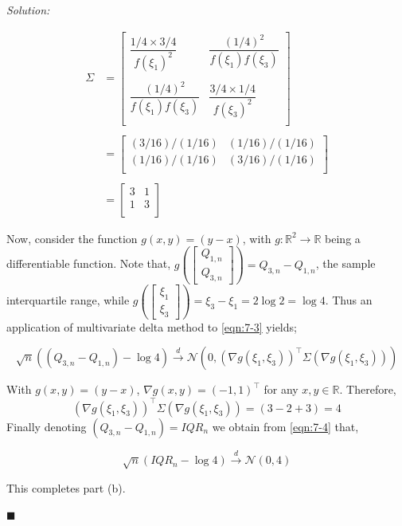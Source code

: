 \documentclass[12pt]{article}
\newcommand{\R}{\mathbb{R}}
\newcommand{\normal}{\mathcal{N}}
\theoremstyle{definition}
\newenvironment{answer}{\textit{Solution: }\quad }{ \hfill $\blacksquare$}
\numberwithin{equation}{section}
\begin{document}
\begin{answer}
\begin{enumerate}
        \begin{align*}
            \Sigma
            & = \begin{bmatrix}
                \dfrac{1/4 \times 3/4}{f(\xi_1)^2} & \dfrac{(1/4)^2}{f(\xi_1)f(\xi_3)}\\
                & \\
                \dfrac{(1/4)^2}{f(\xi_1)f(\xi_3)} & \dfrac{3/4 \times 1/4}{f(\xi_3)^2}\\
            \end{bmatrix}\\
            & \\
            & = \begin{bmatrix}
                (3/16)/(1/16) & (1/16)/(1/16)\\
                (1/16)/(1/16) & (3/16)/(1/16)\\
            \end{bmatrix}\\
            & \\
            & = \begin{bmatrix}
                3 & 1\\
                1 & 3\\
            \end{bmatrix}
        \end{align*}
        
        Now, consider the function $g(x, y) = (y - x)$, with $g: \R^2 \rightarrow \R$ being a differentiable function. Note that, $g\left( \begin{bmatrix}
            Q_{1, n}\\ Q_{3, n}
        \end{bmatrix} \right) = Q_{3, n} - Q_{1, n}$, the sample interquartile range, while $g\left( \begin{bmatrix}
            \xi_1 \\ \xi_3
        \end{bmatrix}\right) = \xi_3 - \xi_1 = 2 \log 2 = \log 4$. Thus an application of multivariate delta method to \cref{eqn:7-3} yields;

        \begin{equation}
            \sqrt{n} ((Q_{3, n} - Q_{1, n}) - \log 4) \xrightarrow{d} \normal\left( 0, (\nabla g(\xi_1, \xi_3))^{\intercal} \Sigma (\nabla g(\xi_1, \xi_3))  \right)
            \label{eqn:7-4}
        \end{equation}

        With $g(x, y) = (y - x)$, $\nabla g(x, y) = (-1, 1)^{\intercal}$ for any $x, y \in \R$. Therefore, 
        $$(\nabla g(\xi_1, \xi_3))^{\intercal} \Sigma (\nabla g(\xi_1, \xi_3)) = (3 - 2 + 3) = 4$$
        Finally denoting $(Q_{3,n} - Q_{1, n}) = IQR_n$ we obtain from \cref{eqn:7-4} that,

        $$
        \sqrt{n}(IQR_n - \log 4) \xrightarrow{d} \normal(0, 4)
        $$

        This completes part (b).
    \end{enumerate}
\end{answer}
\end{document}
